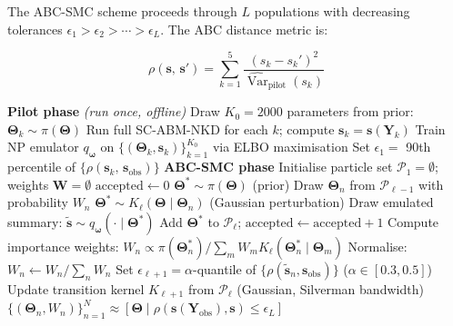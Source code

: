 \documentclass[12pt,a4paper]{article}
\theoremstyle{definition}
\newcommand{\Var}{\operatorname{Var}}
\newcommand{\bs}{\bm{s}}
\newcommand{\bTheta}{\bm{\Theta}}
\newcommand{\bomega}{\bm{\omega}}
\begin{document}
The ABC-SMC scheme proceeds through $L$ populations with decreasing tolerances
$\epsilon_1 > \epsilon_2 > \cdots > \epsilon_L$.  The ABC distance metric is:

\begin{equation}
  \rho(\bs,\, \bs')
  = \sum_{k=1}^{5}
    \frac{(s_k - s_k')^2}{\widehat{\Var}_{\mathrm{pilot}}(s_k)}
  \label{eq:distance}
\end{equation}

\begin{algorithm}[H]
\caption{Neural-Emulated ABC-SMC for SC-ABM-NKD}
\label{alg:abc}
\begin{algorithmic}[1]
\Statex \textbf{Pilot phase} \textit{(run once, offline)}
\State Draw $K_0 = 2000$ parameters from prior: $\bTheta_k \sim \pi(\bTheta)$
\State Run full SC-ABM-NKD for each $k$; compute $\bs_k = \bs(\mathbf{Y}_k)$
\State Train NP emulator $q_{\bomega}$ on $\{(\bTheta_k, \bs_k)\}_{k=1}^{K_0}$
  via ELBO maximisation
\State Set $\epsilon_1 = $ 90th percentile of $\{\rho(\bs_k,\, \bs_{\mathrm{obs}})\}$
\Statex
\Statex \textbf{ABC-SMC phase}
\State Initialise particle set $\mathcal{P}_1 = \emptyset$;
  weights $\mathbf{W} = \emptyset$
  \State $\mathrm{accepted} \leftarrow 0$
      \State $\bTheta^* \sim \pi(\bTheta)$ \hfill (prior)
    \Else
      \State Draw $\bTheta_n$ from $\mathcal{P}_{\ell-1}$ with probability $W_n$
      \State $\bTheta^* \sim K_\ell(\bTheta \mid \bTheta_n)$ \hfill (Gaussian perturbation)
    \EndIf
    \State Draw emulated summary: $\tilde{\bs} \sim q_{\bomega}(\cdot \mid \bTheta^*)$
    \If{$\rho(\tilde{\bs},\, \bs_{\mathrm{obs}}) \leq \epsilon_\ell$}
      \State Add $\bTheta^*$ to $\mathcal{P}_\ell$; $\mathrm{accepted} \leftarrow \mathrm{accepted}+1$
    \EndIf
  \EndWhile
  \State Compute importance weights:
    $W_n \propto \pi(\bTheta_n^*)\big/{\sum_m W_m K_\ell(\bTheta_n^* \mid \bTheta_m)}$
  \State Normalise: $W_n \leftarrow W_n / \sum_n W_n$
  \State Set $\epsilon_{\ell+1} = \alpha$-quantile of
    $\{\rho(\tilde{\bs}_n, \bs_{\mathrm{obs}})\}$
    \hfill ($\alpha \in [0.3, 0.5]$)
  \State Update transition kernel $K_{\ell+1}$ from $\mathcal{P}_\ell$
    (Gaussian, Silverman bandwidth)
\EndFor
\State \Return $\{(\bTheta_n, W_n)\}_{n=1}^{N} \approx [\bTheta \mid
  \rho(\bs(\mathbf{Y}_{\mathrm{obs}}), \bs) \leq \epsilon_L]$
\end{algorithmic}
\end{algorithm}
\end{document}
